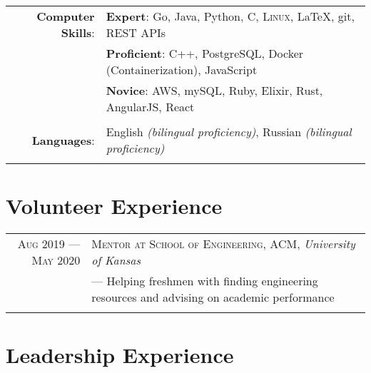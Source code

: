 \documentclass[a4paper, 10pt]{article}
\begin{document}
\begin{tabular}{rl}
	\textbf{Computer Skills}: &
	\textbf{Expert}: Go, Java, Python, C, \textsc{Linux}, \LaTeX, git, REST APIs                               \\&
	\textbf{Proficient}: C++, PostgreSQL, Docker (Containerization), JavaScript                                \\&
	\textbf{Novice}: AWS, mySQL, Ruby, Elixir, Rust, AngularJS, React                                          \\\\
	\textbf{Languages}:       & English \emph{(bilingual proficiency)}, Russian \emph{(bilingual proficiency)} \\\\
\end{tabular}

\section{Volunteer Experience}

\begin{tabular}{r|p{12cm}}

	\textsc{Aug 2019 --- May 2020} & \textsc{Mentor at School of Engineering, ACM}, \emph{University of Kansas} \\&\footnotesize{
		--- Helping freshmen with finding engineering resources and advising on academic performance
	}                                                                                                           \\\multicolumn{2}{c}{}\\
\end{tabular}

\section{Leadership Experience}
\end{document}
